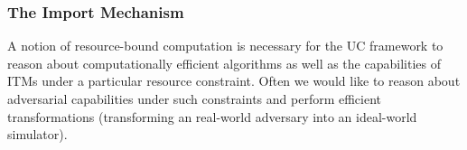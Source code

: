 \begin{theorem}[Composition]

  

\subsubsection{The Import Mechanism}
A notion of resource-bound computation is necessary for the UC framework to reason about computationally efficient algorithms as well as the capabilities of ITMs under a particular resource constraint.
Often we would like to reason about adversarial capabilities under such constraints and perform efficient transformations (transforming an real-world adversary into an ideal-world simulator).


\end{theorem}
